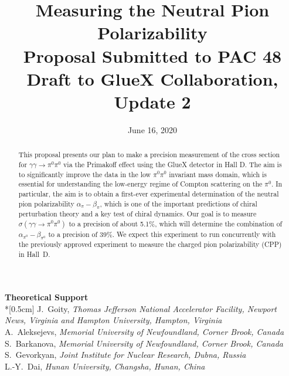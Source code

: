 \documentclass[letterpaper,12pt]{article}
\date{June 16, 2020}
\title{\Large \textbf{Measuring the Neutral Pion Polarizability}\\
\large{Proposal Submitted to PAC 48} \\
\large{ Draft to GlueX Collaboration, Update 2}
}
\begin{document}
\setlength{\parindent}{2em}


\maketitle

\thispagestyle{empty}

\vspace{3cm}
{\large\textbf {Theoretical Support}} \\*[0.5cm]
\small{J.~Goity, \textit{Thomas Jefferson National Accelerator Facility, Newport News, Virginia and Hampton University, Hampton, Virginia}\\
A.~Aleksejevs,  \textit{Memorial University of Newfoundland, Corner Brook, Canada}\\
S.~Barkanova,  \textit{Memorial University of Newfoundland, Corner Brook, Canada}\\
S.~Gevorkyan,  \textit{Joint Institute for Nuclear Research, Dubna, Russia}\\
L.-Y.~Dai,  \textit{Hunan University, Changsha, Hunan, China}
}



\begin{abstract}
This proposal presents our plan to make a precision measurement of the
cross section for $\gamma \gamma \rightarrow \pi^0 \pi^0$ via the
Primakoff effect using the GlueX detector in Hall D. The aim is to
significantly improve the data in the low $\pi^0\pi^0$ invariant mass
domain, which is essential for understanding the low-energy regime of
Compton scattering on the $\pi^0$. In particular, the aim is to obtain
a first-ever experimental determination of the neutral pion
polarizability $\alpha_\pi - \beta_\pi$, which is one of the important
predictions of chiral perturbation theory and a key test of chiral
dynamics.  Our goal is to measure
$\sigma(\gamma\gamma\rightarrow\pi^0\pi^0)$ to a precision of about
5.1\%, which will determine the combination of
$\alpha_{\pi^0}-\beta_{\pi^0}$ to a precision of 39\%. We expect this
experiment to run concurrently with the previously approved experiment
to measure the charged pion polarizability (CPP)~\cite{CPPexp} in Hall~D.
\end{abstract}
\end{document}
